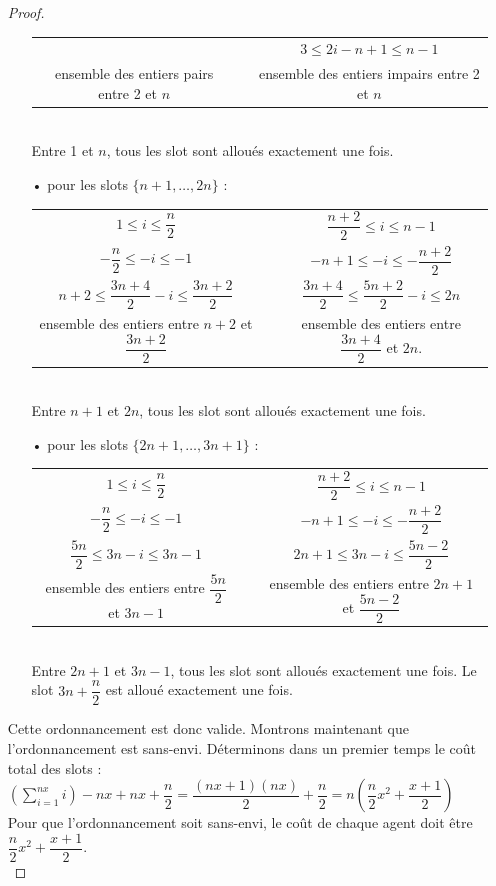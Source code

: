 \documentclass[12pt]{article}
\theoremstyle{definition}
\begin{document}
\begin{itemize}
\begin{proof}
\begin{itemize}
\begin{tabular}{ccc}
                  & & $3\leq 2i - n + 1\leq n-1$\\
ensemble des entiers pairs entre 2 et $n$ & & ensemble des entiers impairs entre 2 et $n$
\end{tabular}\\
Entre 1 et $n$, tous les slot sont alloués exactement une fois.
\item[•] pour les slots $\{n+1,\dots,2n\}$ :\\
\begin{tabular}{ccc}
$1\leq i \leq \dfrac{n}{2}$ & & $\dfrac{n+2}{2}\leq i \leq n-1$\\
$-\dfrac{n}{2}\leq -i\leq -1$ & & $-n+1\leq -i \leq -\dfrac{n+2}{2}$\\
$n+2 \leq \dfrac{3n+4}{2}-i\leq\dfrac{3n+2}{2}$ & & $\dfrac{3n+4}{2}\leq \dfrac{5n+2}{2}-i\leq 2n$\\
ensemble des entiers entre $n+2$ et $\dfrac{3n+2}{2}$ & & ensemble des entiers entre $\dfrac{3n+4}{2}$ et $2n$. 
\end{tabular}\\
Entre $n+1$ et $2n$, tous les slot sont alloués exactement une fois.
\item[•] pour les slots $\{2n+1,\dots,3n + 1\}$ :\\
\begin{tabular}{ccc}
$1\leq i \leq \dfrac{n}{2}$ & & $\dfrac{n+2}{2}\leq i \leq n-1$\\
$-\dfrac{n}{2}\leq -i\leq -1$ & & $-n+1\leq -i \leq -\dfrac{n+2}{2}$\\
$\dfrac{5n}{2}\leq 3n-i\leq 3n-1$ & & $2n+1\leq 3n-i \leq \dfrac{5n-2}{2}$\\
ensemble des entiers entre $\dfrac{5n}{2}$ et $3n-1$ & & ensemble des entiers entre $2n + 1$ et $\dfrac{5n-2}{2}$
\end{tabular}\\
Entre $2n+1$ et $3n-1$, tous les slot sont alloués exactement une fois. Le slot $3n + \dfrac{n}{2}$ est alloué exactement une fois.\\
\end{itemize}
Cette ordonnancement est donc valide. Montrons maintenant que l'ordonnancement est sans-envi. Déterminons dans un premier temps le coût total des slots :\\
$(\sum\limits_{i=1}^{nx}i)-nx+nx+\dfrac{n}{2} = \dfrac{(nx+1)(nx)}{2}+\dfrac{n}{2} = n(\dfrac{n}{2}x^2+\dfrac{x+1}{2})$\\
Pour que l'ordonnancement soit sans-envi, le coût de chaque agent doit être $\dfrac{n}{2}x^2+\dfrac{x+1}{2}$.\\

\end{proof}
\end{itemize}
\end{document}
